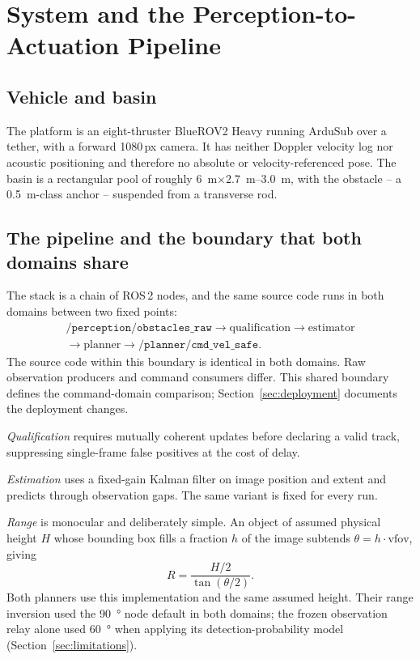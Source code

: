 \section{System and the Perception-to-Actuation Pipeline}
\label{sec:system}

\subsection{Vehicle and basin}

The platform is an eight-thruster BlueROV2 Heavy running ArduSub over a
tether, with a forward \num{1080}\,px camera. It has neither Doppler
velocity log nor acoustic positioning and therefore no absolute or
velocity-referenced pose. The basin is a rectangular pool of roughly
\SI{6}{\metre}$\times$\SIrange{2.7}{3.0}{\metre}, with the obstacle -- a
\SI{0.5}{\metre}-class anchor -- suspended from a transverse rod.

\subsection{The pipeline and the boundary that both domains share}

The stack is a chain of ROS\,2 nodes, and the same source code runs in
both domains between two fixed points:
\begin{multline*}
\texttt{/perception/obstacles\_raw} \rightarrow \text{qualification}
\rightarrow \text{estimator} \\
\rightarrow \text{planner} \rightarrow
\texttt{/planner/cmd\_vel\_safe}.
\end{multline*}
The source code within this boundary is identical in both domains. Raw
observation producers and command consumers differ. This shared boundary
defines the command-domain comparison; Section~\ref{sec:deployment}
documents the deployment changes.

\emph{Qualification} requires mutually coherent updates before declaring
a valid track, suppressing single-frame false positives at the cost of
delay.

\emph{Estimation} uses a fixed-gain Kalman filter on image position and
extent and predicts through observation gaps. The same variant is fixed
for every run.

\emph{Range} is monocular and deliberately simple. An object of assumed
physical height $H$ whose bounding box fills a fraction $h$ of the image
subtends $\theta = h \cdot \mathrm{vfov}$, giving
\begin{equation}
R = \frac{H/2}{\tan(\theta/2)} .
\label{eq:range}
\end{equation}
Both planners use this implementation and the same assumed height. Their
range inversion used the \SI{90}{\degree} node default in both domains;
the frozen observation relay alone used \SI{60}{\degree} when applying
its detection-probability model (Section~\ref{sec:limitations}).

